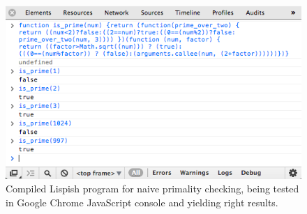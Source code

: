 \begin{figure}[ht]
	\centering
	\includegraphics[scale=0.65]{Graphics/primality_test.png}
\caption{Compiled Lispish program for naive primality checking, being tested in Google Chrome JavaScript console and yielding right results.}
\label{fig:primality-javascript-test}
\end{figure}
